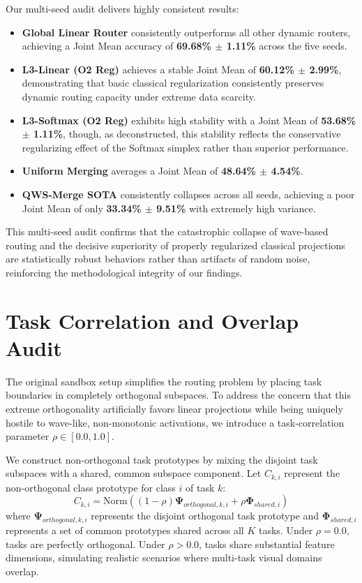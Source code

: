 Our multi-seed audit delivers highly consistent results:
\begin{itemize}
    \item \textbf{Global Linear Router} consistently outperforms all other dynamic routers, achieving a Joint Mean accuracy of \textbf{69.68\% $\pm$ 1.11\%} across the five seeds.
    \item \textbf{L3-Linear (O2 Reg)} achieves a stable Joint Mean of \textbf{60.12\% $\pm$ 2.99\%}, demonstrating that basic classical regularization consistently preserves dynamic routing capacity under extreme data scarcity.
    \item \textbf{L3-Softmax (O2 Reg)} exhibits high stability with a Joint Mean of \textbf{53.68\% $\pm$ 1.11\%}, though, as deconstructed, this stability reflects the conservative regularizing effect of the Softmax simplex rather than superior performance.
    \item \textbf{Uniform Merging} averages a Joint Mean of \textbf{48.64\% $\pm$ 4.54\%}.
    \item \textbf{QWS-Merge SOTA} consistently collapses across all seeds, achieving a poor Joint Mean of only \textbf{33.34\% $\pm$ 9.51\%} with extremely high variance.
\end{itemize}
This multi-seed audit confirms that the catastrophic collapse of wave-based routing and the decisive superiority of properly regularized classical projections are statistically robust behaviors rather than artifacts of random noise, reinforcing the methodological integrity of our findings.

\section{Task Correlation and Overlap Audit}
\label{sec:correlation_audit_app}
The original sandbox setup simplifies the routing problem by placing task boundaries in completely orthogonal subspaces. To address the concern that this extreme orthogonality artificially favors linear projections while being uniquely hostile to wave-like, non-monotonic activations, we introduce a task-correlation parameter $\rho \in [0.0, 1.0]$. 

We construct non-orthogonal task prototypes by mixing the disjoint task subspaces with a shared, common subspace component. Let $C_{k, i}$ represent the non-orthogonal class prototype for class $i$ of task $k$:
\begin{equation}
    C_{k, i} = \text{Norm}\left( (1 - \rho) \boldsymbol{\Psi}_{orthogonal, k, i} + \rho \boldsymbol{\Phi}_{shared, i} \right)
\end{equation}
where $\boldsymbol{\Psi}_{orthogonal, k, i}$ represents the disjoint orthogonal task prototype and $\boldsymbol{\Phi}_{shared, i}$ represents a set of common prototypes shared across all $K$ tasks. Under $\rho = 0.0$, tasks are perfectly orthogonal. Under $\rho > 0.0$, tasks share substantial feature dimensions, simulating realistic scenarios where multi-task visual domains overlap.

